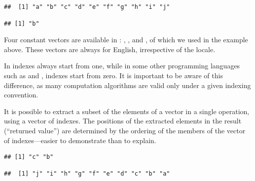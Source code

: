 \documentclass[krantz2]{krantz}\usepackage{knitr}%
\begin{document}
\begin{knitrout}\footnotesize
{}\color{fgcolor}\begin{kframe}
\begin{alltt}
 \hlkwb{<-} \hlstd{letters[}\hlopt{:}\hlstd{]}
\end{alltt}
\begin{verbatim}
##  [1] "a" "b" "c" "d" "e" "f" "g" "h" "i" "j"
\end{verbatim}
\begin{alltt}
\hlstd{a[}\hlstd{]}
\end{alltt}
\begin{verbatim}
## [1] "b"
\end{verbatim}
\end{kframe}
\end{knitrout}

\begin{explainbox}
Four constant vectors are available in \Rlang: , ,  and  , of which we used  in the example above. These vectors are always for English, irrespective of the locale.
\end{explainbox}

\begin{warningbox}
In \Rlang indexes always start from one, while in some other programming languages such as \Clang and \Cpplang, indexes start from zero. It is important to be aware of this difference, as many computation algorithms are valid only under a given indexing convention.
\end{warningbox}

It is possible to extract a subset of the elements of a vector in a single operation, using a vector of indexes. The positions of the extracted elements in the result (``returned value'') are determined by the ordering of the members of the vector of indexes---easier to demonstrate than to explain.

\begin{knitrout}\footnotesize
{}\color{fgcolor}\begin{kframe}
\begin{alltt}
\hlstd{a[}\hlstd{(}\hlstd{,}\hlstd{)]}
\end{alltt}
\begin{verbatim}
## [1] "c" "b"
\end{verbatim}
\begin{alltt}
\hlstd{a[}\hlopt{:}\hlstd{]}
\end{alltt}
\begin{verbatim}
##  [1] "j" "i" "h" "g" "f" "e" "d" "c" "b" "a"
\end{verbatim}
\end{kframe}
\end{knitrout}
\end{document}
